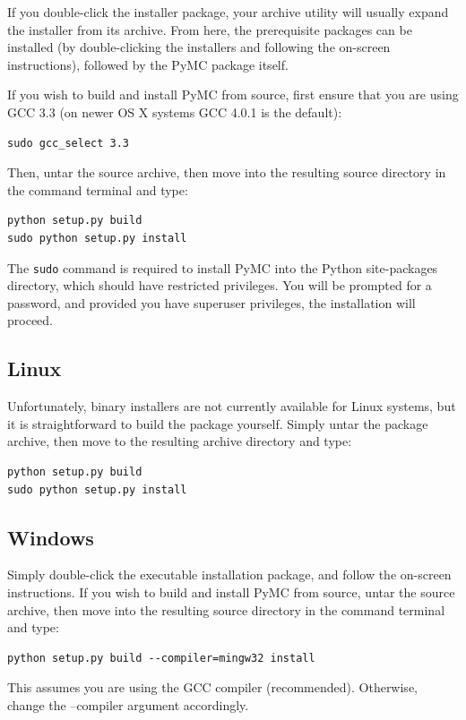 \documentclass[]{book}
\begin{document}
If you double-click the installer package, your archive utility will usually expand the installer from its archive. From here, the prerequisite packages can be installed (by double-clicking the installers and following the on-screen instructions), followed by the PyMC package itself.

If you wish to build and install PyMC from source, first ensure that you are using GCC 3.3 (on newer OS X systems GCC 4.0.1 is the default):
\begin{verbatim}
sudo gcc_select 3.3
\end{verbatim}
Then, untar the source archive, then move into the resulting source directory in the command terminal and type:
\begin{verbatim}
python setup.py build
sudo python setup.py install
\end{verbatim}
The \verb=sudo= command is required to install PyMC into the Python site-packages directory, which should have restricted privileges. You will be prompted for a password, and provided you have superuser privileges, the installation will proceed.

\subsection{Linux}

Unfortunately, binary installers are not currently available for Linux systems, but it is straightforward to build the package yourself. Simply untar the package archive, then move to the resulting archive directory and type:
\begin{verbatim}
python setup.py build
sudo python setup.py install
\end{verbatim}

\subsection{Windows}

Simply double-click the executable installation package, and follow the on-screen instructions.
If you wish to build and install PyMC from source, untar the source archive, then move into the resulting source directory in the command terminal and type:
\begin{verbatim}
python setup.py build --compiler=mingw32 install
\end{verbatim}
This assumes you are using the GCC compiler (recommended). Otherwise, change the --compiler argument accordingly.
\end{document}
